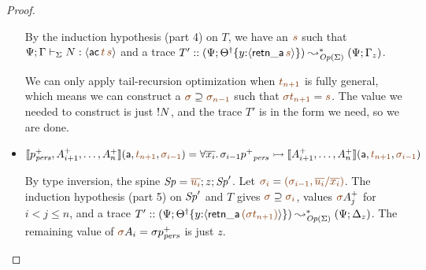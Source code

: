 \begin{proof}
\begin{itemize}
  \smallskip
  By the induction hypothesis (part 4) on $T$, we have an $\lf{s}$ such
  that $\slst{\Sigma}{\Psi}{\Gamma}{N}{\susp{{\sf ac}\,\lf{t}\,\lf{s}}}$ and a 
  trace
  $T' :: (\Psi; \tackon{\opsubst{\Theta}}{y{:}\susp{{\sf retn\_a}\,\lf{s}}}) 
   \leadsto^*_{\transop{\Sigma}}
  (\Psi; \Gamma_z)$. 


  \smallskip
  We can only apply tail-recursion optimization when $\lf{t_{n+1}}$ is 
  fully general, which means we can construct
  a $\lf{\sigma} \supseteq \lf{\sigma_{n-1}}$ such that $\lf{\sigma{t_{n+1}}} = \lf{s}$. The value we needed to construct is just 
  ${!}{{N}}$, and the trace $T'$ is in the form we need,
  so we are done.
  \bigskip

\item $\opbasic{p^+_\mpers,A^+_{i+1},\ldots,A^+_n}{t_{n+1}}{\sigma_{i-1}} 
  = \forall \overline{x_i}.\, \sigma_{i-1}{p^+}_\mpers \lefti \opbasic{A^+_{i+1},\ldots,A^+_n}{t_{n+1}}{\sigma_{i-1}}$
 
  \bigskip
  By type inversion, the spine
  $\Sp = \lf{\overline{u_i}}; z; \Sp'$.
  Let $\lf{\sigma_i} = \lf{(\sigma_{i-1},\overline{u_i}/\overline{x_i})}$. The
  induction hypothesis (part 5) on ${\it Sp}'$ and $T$
  gives $\lf{\sigma} \supseteq \lf{\sigma_{i}}$, values
  $\lf\sigma{A^+_{j}}$ for $i < j \leq n$, and 
  a trace $T' :: (\Psi; \tackon{\opsubst{\Theta}}{y{:}\susp{{\sf retn\_a}\,\lf{(\sigma t_{n+1})}}})
  \leadsto^*_{\transop{\Sigma}}
 (\Psi; \Delta_z)$. The remaining value of $\lf\sigma A_i = \sigma{p^+_\mpers}$
  is just $z$.
  \bigskip


\end{itemize}
\end{proof}
